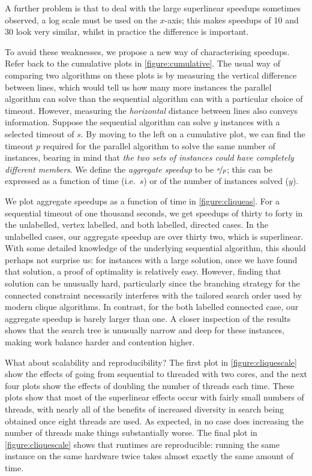 \documentclass{llncs}
\begin{document}
A further problem is that to deal with the large superlinear speedups sometimes observed, a log
scale must be used on the $x$-axis; this makes speedups of 10 and 30 look very similar, whilst in
practice the difference is important.

To avoid these weaknesses, we propose a new way of characterising speedups. Refer back to the
cumulative plots in \cref{figure:cumulative}. The usual way of comparing two algorithms on these
plots is by measuring the vertical difference between lines, which would tell us how many more
instances the parallel algorithm can solve than the sequential algorithm can with a particular
choice of timeout.  However, measuring the \emph{horizontal} distance between lines also conveys
information. Suppose the sequential algorithm can solve $y$ instances with a selected timeout of
$s$. By moving to the left on a cumulative plot, we can find the timeout $p$ required for the
parallel algorithm to solve the same number of instances, bearing in mind that \emph{the two sets of
instances could have completely different members}. We define the \emph{aggregate speedup} to be
$\nicefrac{s}{p}$; this can be expressed as a function of time (i.e.\ $s$) or of the number of
instances solved ($y$).

We plot aggregate speedups as a function of time in \cref{figure:cliqueas}. For a sequential timeout
of one thousand seconds, we get speedups of thirty to forty in the unlabelled, vertex labelled, and
both labelled, directed cases. In the unlabelled cases, our aggregate speedup are over thirty two,
which is superlinear.  With some detailed knowledge of the underlying sequential algorithm, this
should perhaps not surprise us: for instances with a large solution, once we have found that
solution, a proof of optimality is relatively easy. However, finding that solution can be unusually
hard, particularly since the branching strategy for the connected constraint necessarily interferes
with the tailored search order used by modern clique algorithms.  In contrast, for the both labelled
connected case, our aggregate speedup is barely larger than one. A closer inspection of the results
shows that the search tree is unusually narrow and deep for these instances, making work balance
harder and contention higher.

What about scalability and reproducibility? The first plot in \cref{figure:cliquescale} show the
effects of going from sequential to threaded with two cores, and the next four plots show the
effects of doubling the number of threads each time. These plots show that most of the superlinear
effects occur with fairly small numbers of threads, with nearly all of the benefits of increased
diversity in search being obtained once eight threads are used. As expected, in no case does
increasing the number of threads make things substantially worse.
The final plot in \cref{figure:cliquescale} shows that runtimes are reproducible: running the same
instance on the same hardware twice takes almost exactly the same amount of time.
\end{document}
